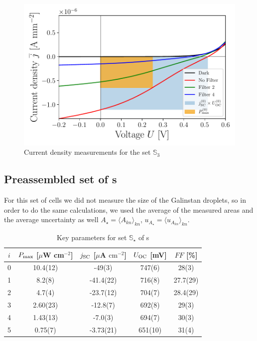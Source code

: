 \documentclass[a4paper,10pt,twocolumn]{article}
\begin{document}
\begin{extract*}
\begin{figure}[h]\centering
	\includegraphics[width=\columnwidth]{../../../IV-Curve-Analysis/OSC2Graph.pdf}
	\caption{Current density measurements for the set $\mathbb{S}_3$}
	\label{fig:OSC3Graph}
\end{figure}

\subsection{Preassembled set of \BHSC s}

For this set of cells we did not measure the size of the Galinstan droplets, so in order to do the same calculations, we used the average of the measured areas and the average uncertainty as well $A_\star = \langle A_{kn} \rangle_{kn}$, $u_{A_\star} = \langle u_{A_{kn}}  \rangle_{kn}$.

\begin{table}[h]\centering
	\caption{Key parameters for set $\mathbb{S}_\star$ of \BHSC s}
	\label{tab:keyparamsstar}
	\begin{tabular}{@{}ccccc@{}}\toprule
		$i$ & $P_{\text{max}}$ [$\mu$W cm$^{-2}$] & $j_{\text{SC}}$ [$\mu$A $\mathrm{cm}^{-2}$] & $U_{\text{OC}}$ [mV] & $FF$ [\%]\\\midrule
		0 &   10.4(12)  &  -49(3)  & 747(6) & 28(3) \\ 
		1 &   8.2(8)  &  -41.4(22)  & 716(8) & 27.7(29) \\
		2 &   4.7(4)  &  -23.7(12)  & 704(7) & 28.4(29) \\
		3 &   2.60(23)  &  -12.8(7)  & 692(8) & 29(3) \\
		4 &   1.43(13)  &  -7.0(3)  & 694(7) & 30(3)\\
		5 &  0.75(7)  &  -3.73(21)  & 651(10) & 31(4) \\\bottomrule
	\end{tabular}
\end{table}


\end{extract*}
\end{document}
